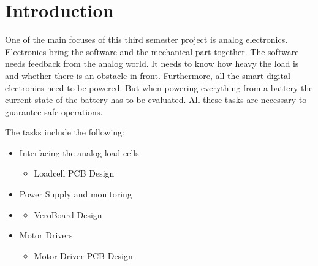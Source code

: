 \documentclass[../report.tex]{subfiles}
\begin{document}
\maketitle

\section*{Introduction}

One of the main focuses of this third semester project is analog electronics. Electronics bring the software and the mechanical part together. 
The software needs feedback from the analog world. It needs to know how heavy the load is and
whether there is an obstacle in front. Furthermore, all the smart digital electronics need to be powered. 
But when powering everything from a battery the current state of the battery has to be evaluated.
All these tasks are necessary to guarantee safe operations.

\quad
The tasks include the following:

\begin{itemize}
    \item Interfacing the analog load cells
    \begin{itemize}
      \item Loadcell PCB Design
    \end{itemize} 
    \item Power Supply and monitoring
    \item \begin{itemize}
      \item VeroBoard Design
    \end{itemize}
    \item Motor Drivers
    \begin{itemize}
      \item Motor Driver PCB Design
    \end{itemize}  
\end{itemize}
\end{document}
